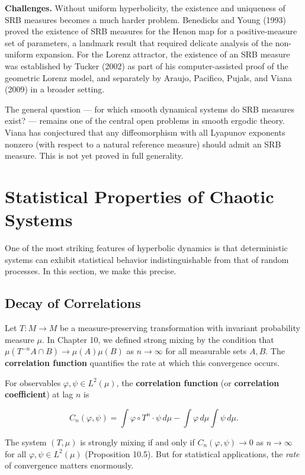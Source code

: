 \textbf{Challenges.} Without uniform hyperbolicity, the existence and uniqueness of SRB measures becomes a much harder problem. Benedicks and Young (1993) proved the existence of SRB measures for the Henon map for a positive-measure set of parameters, a landmark result that required delicate analysis of the non-uniform expansion. For the Lorenz attractor, the existence of an SRB measure was established by Tucker (2002) as part of his computer-assisted proof of the geometric Lorenz model, and separately by Araujo, Pacifico, Pujals, and Viana (2009) in a broader setting.

The general question --- for which smooth dynamical systems do SRB measures exist? --- remains one of the central open problems in smooth ergodic theory. Viana has conjectured that any diffeomorphism with all Lyapunov exponents nonzero (with respect to a natural reference measure) should admit an SRB measure. This is not yet proved in full generality.


\section{Statistical Properties of Chaotic Systems}\label{sec:12.3}

One of the most striking features of hyperbolic dynamics is that deterministic systems can exhibit statistical behavior indistinguishable from that of random processes. In this section, we make this precise.


\subsection{Decay of Correlations}\label{sec:12.3.1}

Let $T: M \to M$ be a measure-preserving transformation with invariant probability measure $\mu$. In Chapter 10, we defined strong mixing by the condition that $\mu(T^{-n}A \cap B) \to \mu(A)\mu(B)$ as $n \to \infty$ for all measurable sets $A, B$. The \textbf{correlation function} quantifies the rate at which this convergence occurs.

\begin{definition}\label{def:12.10}
For observables $\varphi, \psi \in L^2(\mu)$, the \textbf{correlation function} (or \textbf{correlation coefficient}) at lag $n$ is

\[
C_n(\varphi, \psi) = \int \varphi \circ T^n \cdot \psi \, d\mu - \int \varphi \, d\mu \int \psi \, d\mu.
\]

The system $(T, \mu)$ is strongly mixing if and only if $C_n(\varphi, \psi) \to 0$ as $n \to \infty$ for all $\varphi, \psi \in L^2(\mu)$ (Proposition 10.5). But for statistical applications, the \textit{rate} of convergence matters enormously.
\end{definition}


